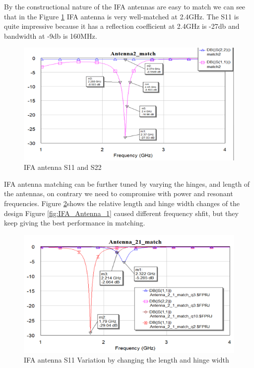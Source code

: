 By the constructional nature of the IFA antennas are easy to match we can see that in the Figure \ref{fig:IFA_Antenna_reflection} IFA antenna is very well-matched at 2.4GHz. The S11 is quite impressive because it has a reflection coefficient at 2.4GHz is -27db and bandwidth at -9db is 160MHz.
\begin{figure}[h]
	\centering
	\includegraphics[width=1\textwidth]{Chap03/Figures/IFA_antenna_reflecctions.PNG}
	\caption{IFA antenna S11 and S22}
	\label{fig:IFA_Antenna_reflection}
\end{figure}
IFA antenna matching can be further tuned by varying the hinges, and length of the antennas, on contrary we need to compromise with power and resonant frequencies. Figure \ref{fig:IFA_S11_Change}shows the relative length and hinge width changes of the design Figure \ref{fig:IFA_Antenna_1} caused different frequency shfit, but they keep giving the best performance in matching.
\begin{figure}[h]
	\centering
	\includegraphics[width=1\textwidth]{Chap03/Figures/IFA_S11_Change.PNG}
	\caption{IFA antenna S11 Variation by changing the length and hinge width}
	\label{fig:IFA_S11_Change}
\end{figure}

